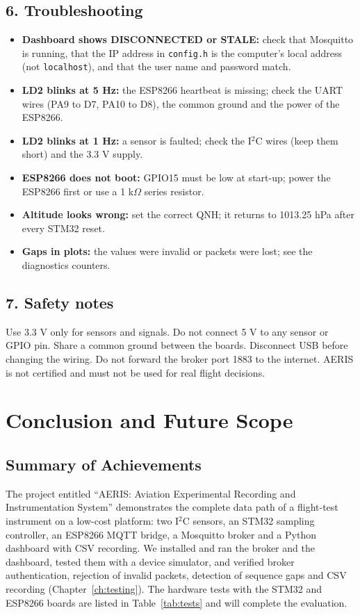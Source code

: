 \documentclass[12pt,a4paper]{report}
\begin{document}
\section*{6. Troubleshooting}
\begin{itemize}
\item \textbf{Dashboard shows DISCONNECTED or STALE:} check that Mosquitto is running, that the IP address in \texttt{config.h} is the computer's local address (not \texttt{localhost}), and that the user name and password match.
\item \textbf{LD2 blinks at 5 Hz:} the ESP8266 heartbeat is missing; check the UART wires (PA9 to D7, PA10 to D8), the common ground and the power of the ESP8266.
\item \textbf{LD2 blinks at 1 Hz:} a sensor is faulted; check the I$^2$C wires (keep them short) and the 3.3 V supply.
\item \textbf{ESP8266 does not boot:} GPIO15 must be low at start-up; power the ESP8266 first or use a 1 k$\Omega$ series resistor.
\item \textbf{Altitude looks wrong:} set the correct QNH; it returns to 1013.25 hPa after every STM32 reset.
\item \textbf{Gaps in plots:} the values were invalid or packets were lost; see the diagnostics counters.
\end{itemize}

\section*{7. Safety notes}
Use 3.3 V only for sensors and signals. Do not connect 5 V to any sensor or GPIO pin. Share a common ground between the boards. Disconnect USB before changing the wiring. Do not forward the broker port 1883 to the internet. AERIS is not certified and must not be used for real flight decisions.

\chapter{Conclusion and Future Scope}
\section{Summary of Achievements}
The project entitled ``AERIS: Aviation Experimental Recording and Instrumentation System'' demonstrates the complete data path of a flight-test instrument on a low-cost platform: two I$^2$C sensors, an STM32 sampling controller, an ESP8266 MQTT bridge, a Mosquitto broker and a Python dashboard with CSV recording. We installed and ran the broker and the dashboard, tested them with a device simulator, and verified broker authentication, rejection of invalid packets, detection of sequence gaps and CSV recording (Chapter~\ref{ch:testing}). The hardware tests with the STM32 and ESP8266 boards are listed in Table~\ref{tab:tests} and will complete the evaluation.
\end{document}
